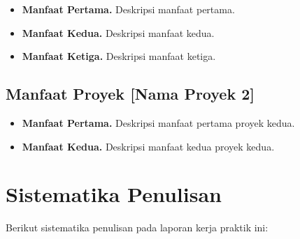 \begin{itemize}[leftmargin=*, itemsep=0pt]
  \item \textbf{Manfaat Pertama.} Deskripsi manfaat pertama.
  \item \textbf{Manfaat Kedua.} Deskripsi manfaat kedua.
  \item \textbf{Manfaat Ketiga.} Deskripsi manfaat ketiga.
\end{itemize}

\subsection{Manfaat Proyek [Nama Proyek 2]}

\begin{itemize}[leftmargin=*, itemsep=0pt]
  \item \textbf{Manfaat Pertama.} Deskripsi manfaat pertama proyek kedua.
  \item \textbf{Manfaat Kedua.} Deskripsi manfaat kedua proyek kedua.
\end{itemize}

\section{Sistematika Penulisan}

Berikut sistematika penulisan pada laporan kerja praktik ini:


